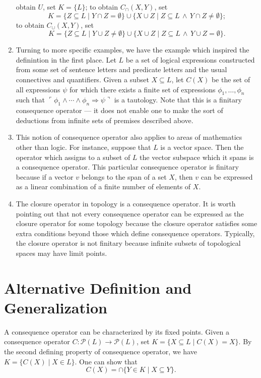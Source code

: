 \documentclass[12pt]{article}
\begin{document}
\begin{enumerate}
obtain $U$, set $K = \{ L \}$; to obtain $C_\cap (X,Y)$, set
\[ K = \{ Z \subseteq L \mid Y \cap Z = \emptyset \} \cup
\{ X \cup Z \mid Z \subseteq L \,\land\, Y \cap Z \not= \emptyset \};\]
to obtain $C_\cup (X,Y)$, set
\[ K = \{ Z \subseteq L \mid Y \cup Z \not= \emptyset \} \cup
\{ X \cup Z \mid Z \subseteq L \,\land\, Y \cup Z = \emptyset \}.\]
\item
Turning to more specific examples, we have the example which inspired the 
definintion in the first place.  Let $L$ be a set of logical expressions
constructed from some set of sentence letters and predicate letters and
the usual connectives and quantifiers.  Given a subset $X \subseteq L$,
let $C(X)$ be the set of all expressions $\psi$ for which there exists
a finite set of expressions $\phi_1, \ldots, \phi_n$ such that
$\ulcorner \phi_1 \land \cdots \land \phi_n \Rightarrow \psi \urcorner$
is a tautology.  Note that this is a finitary consequence operator --- it
does not enable one to make the sort of deductions from infinite sets
of premises described above.
\item
This notion of consequence operator also applies to areas of mathematics
other than logic.  For instance, suppose that $L$ is a vector space.  Then
the operator which assigns to a subset of $L$ the vector subspace which it 
spans is a consequence operator.  This particular consequence operator is
finitary because if a vector $v$ belongs to the span of a set $X$, then
$v$ can be expressed as a linear combination of a finite number of elements
of $X$. 
\item
The closure operator in topology is a
consequence operator.  It is worth pointing out that not every consequence
operator can be expressed as the closure operator for some topology because
the closure operator satisfies some extra conditions beyond those which 
define consequence operators.  Typically, the closure operator is not 
finitary because infinite subsets of topological spaces may have limit
points.
\end{enumerate}

\section{Alternative Definition and Generalization}

A consequence operator can be characterized by its fixed points.  Given 
a consequence operator $C \colon \mathcal{P}(L) \to \mathcal{P}(L)$,
set $K = \{ X \subseteq L \mid C(X) = X\}$.  By the second defining 
property of consequence operator, we have  $K = \{ C(X) \mid X \in L\}$.
One can show that 
 \[C(X) = \cap \{ Y \in K \mid X \subseteq Y \}.\]
\end{document}
